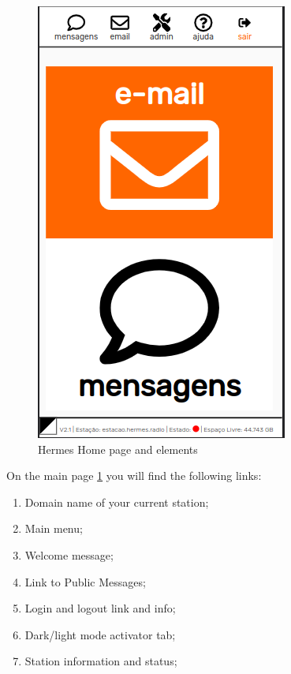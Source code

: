 \documentclass[11pt,a4paper]{article}
\begin{document}
   \begin{figure}[!ht]
    \includegraphics[width=1\columnwidth]{screenshots/frontend/pt_kn/landing.png}
    \caption{Hermes Home page and elements}
    \label{fig:interface}
    \end{figure}
    
On the main page \ref{fig:interface} you will find the following links:

\begin{enumerate}
    \item Domain name of your current station;
    \item Main menu;
    \item Welcome message;
    \item Link to Public Messages;
     \item Login and logout link and info;
     \item Dark/light mode activator tab;
    \item Station information and status;
\end{enumerate}
    
\end{document}
